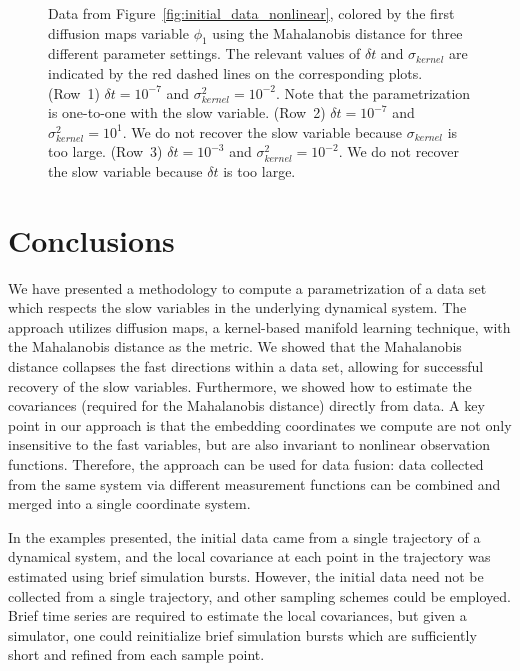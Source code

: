 \begin{figure}[t]
\caption[Comparison of results for different parameter settings]{Data from Figure~\ref{fig:initial_data_nonlinear}, colored by the first diffusion maps variable $\phi_1$ using the Mahalanobis distance for three different parameter settings. The relevant values of $\delta t$ and $\sigma_{kernel}$ are indicated by the red dashed lines on the corresponding plots.  (Row~1) $\delta t = 10^{-7}$ and $\sigma_{kernel}^2 = 10^{-2}$. Note that the parametrization is one-to-one with the slow variable.  (Row~2) $\delta t = 10^{-7}$ and $\sigma_{kernel}^2 = 10^{1}$. We do not recover the slow variable because $\sigma_{kernel}$ is too large. (Row~3)  $\delta t = 10^{-3}$ and $\sigma_{kernel}^2 = 10^{-2}$. We do not recover the slow variable because $\delta t$ is too large.  }
\label{fig:colored_data_nonlinear_cases}
\end{figure}


\section{Conclusions}

We have presented a methodology to compute a parametrization of a data set which respects the slow variables in the underlying dynamical system.
%
The approach utilizes diffusion maps, a kernel-based manifold learning technique, with the Mahalanobis distance as the metric.
%
We showed that the Mahalanobis distance collapses the fast directions within a data set, allowing for successful recovery of the slow variables.
%
Furthermore, we showed how to estimate the covariances (required for the Mahalanobis distance) directly from data.
%
A key point in our approach is that the embedding coordinates we compute are not only insensitive to the fast variables, but are also invariant to nonlinear observation functions.
%
Therefore, the approach can be used for data fusion: data collected from the same system via different measurement functions can be combined and merged into a single coordinate system.

In the examples presented, the initial data came from a single trajectory of a dynamical system, and the local covariance at each point in the trajectory was estimated using brief simulation bursts.
%
However, the initial data need not be collected from a single trajectory, and other sampling schemes could be employed.
%
Brief time series are required to estimate the local covariances, but given a simulator, one could reinitialize brief simulation bursts which are sufficiently short and refined from each sample point.

